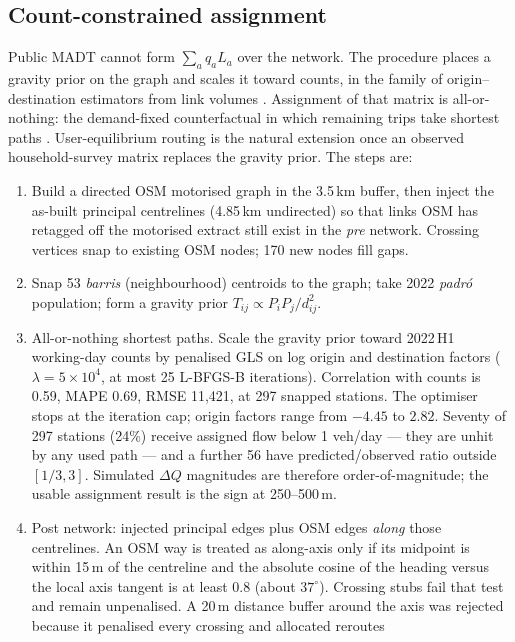 \documentclass[a4paper,fleqn]{cas-dc}
\newcommand{\DQ}{\Delta Q}
\begin{document}
\subsection{Count-constrained assignment}
\label{sec:assign}

Public MADT cannot form $\sum_a q_a L_a$ over the network. The procedure
places a gravity prior on the graph and scales it toward counts, in the
family of origin--destination estimators from link volumes
\citep{VanZuylen1980,Cascetta1984,Spiess1987,Furness1965}. Assignment of that
matrix is all-or-nothing: the demand-fixed counterfactual in which remaining
trips take shortest paths \citep{Wardrop1952}. User-equilibrium routing is the
natural extension once an observed household-survey matrix replaces the
gravity prior. The steps are:
\begin{enumerate}
\item Build a directed OSM motorised graph in the 3.5\,km buffer, then inject
the as-built principal centrelines (4.85\,km undirected) so that links OSM has
retagged off the motorised extract still exist in the \emph{pre} network.
Crossing vertices snap to existing OSM nodes; 170 new nodes fill gaps.
\item Snap 53 \emph{barris} (neighbourhood) centroids to the graph; take 2022
\emph{padr\'o} population; form a gravity prior
$T_{ij} \propto P_i P_j / d_{ij}^{2}$.
\item All-or-nothing shortest paths. Scale the gravity prior toward 2022\,H1
working-day counts by penalised GLS on log origin and destination factors
($\lambda=5\times 10^{4}$, at most 25 L-BFGS-B iterations). Correlation with
counts is 0.59, MAPE 0.69, RMSE 11{,}421, at 297 snapped stations. The
optimiser stops at the iteration cap; origin factors range from $-4.45$ to
$2.82$. Seventy of 297 stations (24\%) receive assigned flow below 1
veh/day --- they are unhit by any used path --- and a further 56 have
predicted/observed ratio outside $[1/3,3]$. Simulated $\DQ$ magnitudes are
therefore order-of-magnitude; the usable assignment result is the sign at
250--500\,m.
\item Post network: injected principal edges plus OSM edges \emph{along} those
centrelines. An OSM way is treated as along-axis only if its midpoint is
within 15\,m of the centreline and the absolute cosine of the heading versus
the local axis tangent is at least 0.8 (about $37^{\circ}$). Crossing stubs
fail that test and remain unpenalised. A 20\,m distance buffer around the
axis was rejected because it penalised every crossing and allocated reroutes

\end{enumerate}
\end{document}
